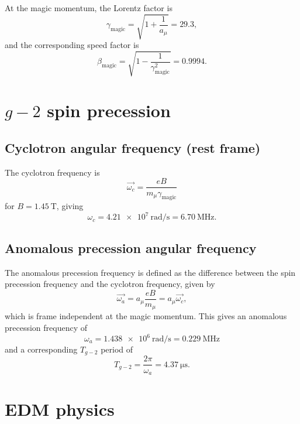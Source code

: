 \documentclass[11pt]{article}
\begin{document}
At the magic momentum, the Lorentz factor is
%
\begin{equation}
\gamma_{\text{magic}} = \sqrt{1 + \frac{1}{a_\mu}} = \num{29.3},
\end{equation}
%
and the corresponding speed factor is 
\begin{equation}
\beta_{\text{magic}} = \sqrt{1 - \frac{1}{\gamma_{\text{magic}}^2}} = \num{0.9994}.
\end{equation}

\section{$g-2$ spin precession}

\subsection{Cyclotron angular frequency (rest frame)}
%
The cyclotron frequency is 
%
\begin{equation}
\vec{\omega_c} = \frac{eB}{m_\mu\gamma_{\text{magic}}}
\end{equation}
%
for $B = \SI{1.45}{\tesla}$, giving
%
\begin{equation}
\omega_c = \SI{4.21e7}{\radian\per\second} = \SI{6.70}{\mega\hertz}.
\end{equation}
%
\subsection{Anomalous precession angular frequency}
%
The anomalous precession frequency is defined as the difference between the spin precession frequency and the cyclotron frequency, given by
%
\begin{equation}
\vec{\omega_a} = a_\mu \frac{eB}{m_\mu} = a_\mu \vec{\omega_c},
\end{equation}
%
which is frame independent at the magic momentum. This gives an anomalous precession frequency of
%
\begin{equation}
\omega_a = \SI{1.438e6}{\radian\per\second} = \SI{0.229}{\mega\hertz}
\end{equation}
%
and a corresponding $T_{g-2}$ period of
%
\begin{equation}
T_{g-2} = \frac{2\pi}{\omega_a} = \SI{4.37}{\micro\second}.
\end{equation}

\section{EDM physics}
%
\end{document}
